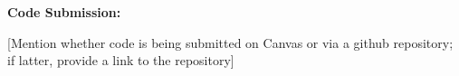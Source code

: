 \documentclass[twoside,11pt]{article}
\renewcommand{\>}{{\rightarrow}}
\newcommand{\1}{{\mathbf 1}}
\newcommand{\0}{{\mathbf 0}}
\begin{document}
\vspace{12pt}

\textbf{Code Submission:}

[Mention whether code is being submitted on Canvas or via a github repository; if latter, provide a link to the repository]


\newpage













% 







\end{document}
